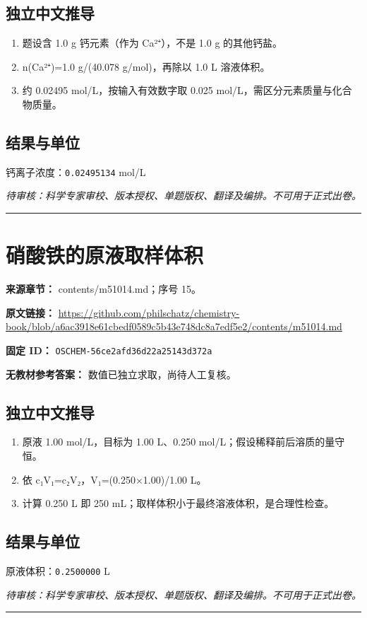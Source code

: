 \documentclass[UTF8,11pt,oneside,openany,fontset=none]{ctexbook}
\begin{document}
\subsection*{独立中文推导}
\begin{enumerate}
\item 题设含 1.0 g 钙元素（作为 Ca²⁺），不是 1.0 g 的其他钙盐。
\item n(Ca²⁺)=1.0 g/(40.078 g/mol)，再除以 1.0 L 溶液体积。
\item 约 0.02495 mol/L，按输入有效数字取 0.025 mol/L，需区分元素质量与化合物质量。
\end{enumerate}
\subsection*{结果与单位}
\noindent 钙离子浓度：\texttt{0.02495134} mol/L\par
\noindent\textit{待审核：科学专家审校、版本授权、单题版权、翻译及编排。不可用于正式出卷。}
\medskip\hrule\medskip
\section{硝酸铁的原液取样体积}
\noindent\textbf{来源章节：} contents/m51014.md；序号 15。\par
\noindent\textbf{原文链接：} \url{https://github.com/philschatz/chemistry-book/blob/a6ac3918e61cbedf0589c5b43e748dc8a7edf5e2/contents/m51014.md}\par
\noindent\textbf{固定 ID：} \texttt{OSCHEM-56ce2afd36d22a25143d372a}\par
\textbf{无教材参考答案：} 数值已独立求取，尚待人工复核。\par
\subsection*{独立中文推导}
\begin{enumerate}
\item 原液 1.00 mol/L，目标为 1.00 L、0.250 mol/L；假设稀释前后溶质的量守恒。
\item 依 c₁V₁=c₂V₂，V₁=(0.250×1.00)/1.00 L。
\item 计算 0.250 L 即 250 mL；取样体积小于最终溶液体积，是合理性检查。
\end{enumerate}
\subsection*{结果与单位}
\noindent 原液体积：\texttt{0.2500000} L\par
\noindent\textit{待审核：科学专家审校、版本授权、单题版权、翻译及编排。不可用于正式出卷。}
\medskip\hrule\medskip
\end{document}
